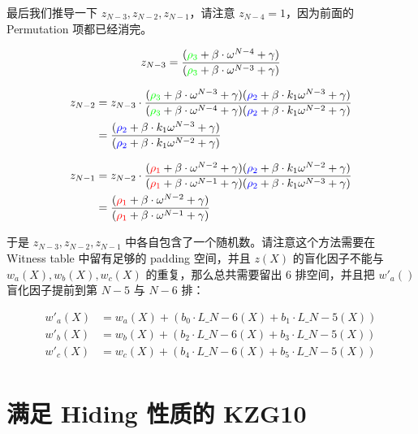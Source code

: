 最后我们推导一下 \(z_{N-3}, z_{N-2}, z_{N-1}\)，请注意
\(z_{N-4}=1\)，因为前面的 Permutation 项都已经消完。

\[
z_{N-3} = \frac{({\color{green}\rho_3} + \beta \cdot \omega^{N-4} + \gamma)}{({\color{green}\rho_3} + \beta \cdot \omega^{N-3}+ \gamma)}
\]

\[
\begin{split}
z_{N-2} &= z_{N-3}\cdot \frac{({\color{green}\rho_3} + \beta \cdot \omega^{N-3} + \gamma)({\color{blue}\rho_2} + \beta \cdot k_1\omega^{N-3} + \gamma)}
{({\color{green}\rho_3} + \beta \cdot \omega^{N-4}+ \gamma)({\color{blue}\rho_2} + \beta \cdot k_1\omega^{N-2}+ \gamma)} \\
&=\frac{({\color{blue}\rho_2} + \beta \cdot k_1\omega^{N-3} + \gamma)}{({\color{blue}\rho_2} + \beta \cdot k_1\omega^{N-2}+ \gamma)}
\end{split}
\]

\[
\begin{split}
z_{N-1} &= z_{N-2}\cdot \frac{({\color{red}\rho_1} + \beta \cdot \omega^{N-2} + \gamma)({\color{blue}\rho_2} + \beta \cdot k_1\omega^{N-2} + \gamma)}
{({\color{red}\rho_1} + \beta \cdot \omega^{N-1}+ \gamma)({\color{blue}\rho_2} + \beta \cdot k_1\omega^{N-3}+ \gamma)}\\
&=\frac{({\color{red}\rho_1} + \beta \cdot \omega^{N-2} + \gamma)}{({\color{red}\rho_1} + \beta \cdot \omega^{N-1}+ \gamma)}
\end{split}
\]

于是 \(z_{N-3}, z_{N-2}, z_{N-1}\)
中各自包含了一个随机数。请注意这个方法需要在 Witness table 中留有足够的
padding 空间，并且 \(z(X)\) 的盲化因子不能与 \(w_a(X),w_b(X),w_c(X)\)
的重复，那么总共需要留出 6 排空间，并且把 \(w'_a()\) 盲化因子提前到第
\(N-5\) 与 \(N-6\) 排：

\[
\begin{split}
w'_a(X) &= w_a(X) + (b_0\cdot L\_{N-6}(X) + b_1\cdot L\_{N-5}(X))\\
w'_b(X) &= w_b(X) + (b_2\cdot L\_{N-6}(X) + b_3\cdot L\_{N-5}(X))\\
w'_c(X) &= w_c(X) + (b_4\cdot L\_{N-6}(X) + b_5\cdot L\_{N-5}(X))\\
\end{split}
\]

\hypertarget{ux6ee1ux8db3-hiding-ux6027ux8d28ux7684-kzg10}{%
\section{满足 Hiding 性质的
KZG10}\label{ux6ee1ux8db3-hiding-ux6027ux8d28ux7684-kzg10}}

